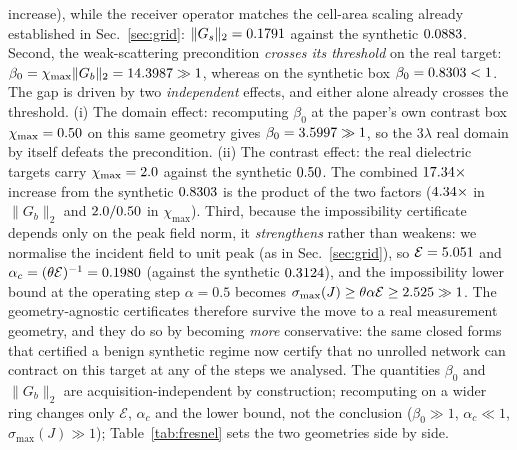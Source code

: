 \documentclass[journal,cmes,article,submit,moreauthors,pdftex]{Definitions/tsp}
\newcommand{\norm}[1]{\lVert #1 \rVert}
\newcommand{\numv}[1]{#1}
\begin{document}
increase), while the receiver operator matches the cell-area scaling already established in
Sec.~\ref{sec:grid}: $\norm{G_s}_2=\numv{\NumFresnelPubGs}$ against the synthetic
$\numv{\NumGridGsLo}$. Second, the
weak-scattering precondition \emph{crosses its threshold} on the real target:
$\beta_0=\chi_{\max}\norm{G_b}_2=\numv{\NumFresnelBeta}\gg1$, whereas on the synthetic box
$\beta_0=\numv{\betacert}<1$. The gap is driven by two \emph{independent} effects, and either
alone already crosses the threshold. (i) The domain effect: recomputing $\beta_0$ at the
paper's own contrast box $\chi_{\max}=\numv{\chimax}$ on this same geometry gives
$\beta_0=\numv{\NumFresnelBetaAtHalf}\gg1$, so the $3\lambda$ real domain by itself defeats
the precondition. (ii) The contrast effect: the real dielectric targets carry
$\chi_{\max}=\numv{\NumFresnelChiMax}$ against the synthetic $\numv{\chimax}$. The combined
$\numv{\NumFresnelBetaRatio}\times$ increase from the synthetic $\numv{\betacert}$ is the
product of the two factors ($\numv{\NumFresnelGbRatio}\times$ in $\norm{G_b}_2$ and
$\numv{\NumFresnelChiMax}/\numv{\chimax}$ in $\chi_{\max}$). Third, because the
impossibility certificate depends only on the peak field norm, it \emph{strengthens} rather
than weakens: we normalise the incident field to unit peak (as in Sec.~\ref{sec:grid}), so
$\mathcal{E}=\numv{\NumFresnelPubEpeak}$ and
$\alpha_c=(\theta\mathcal{E})^{-1}=\numv{\NumFresnelPubAlphaC}$
(against the synthetic $\numv{\NumAlphaC}$), and the impossibility lower bound at the
operating step $\alpha=0.5$ becomes
$\sigma_{\max}(J)\ge\theta\alpha\mathcal{E}\ge\numv{\NumFresnelPubSigmaLB}\gg1$.
The geometry-agnostic certificates therefore survive the move to a real measurement
geometry, and they do so by becoming \emph{more} conservative: the same closed forms that
certified a benign synthetic regime now certify that no unrolled network can contract on this
target at any of the steps we analysed. The quantities $\beta_0$ and $\norm{G_b}_2$
are acquisition-independent by construction; recomputing on a wider ring changes only $\mathcal{E}$, $\alpha_c$ and the lower bound, not the conclusion ($\beta_0\gg1$, $\alpha_c\ll1$, $\sigma_{\max}(J)\gg1$); Table~\ref{tab:fresnel} sets the two geometries side by side.
\end{document}
